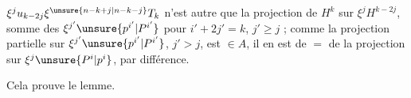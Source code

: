 
$\xi^j u_{k-2j}\xi^{\unsure{n-k+j|n-k-j}}T_k$ n'est autre que la projection de $H^k$ sur $\xi^jH^{k-2j}$, somme des $\xi^{j'}\unsure{p^{i'}|P^{i'}}$ pour $i'+2j'=k$, $j'\geq j$ ;  comme la projection  partielle sur $\xi^{j'}\unsure{p^{i'}|P^{i'}}$, $j'>j$, est $\in A$, il en est de $=$ de la projection sur $\xi^j\unsure{P^i|p^i}$, par différence.

Cela prouve le lemme.

